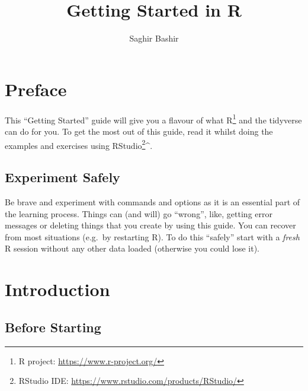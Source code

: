 \documentclass[a4paper,9pt,twocolumn,twoside,printwatermark=false]{pinp}
\title{Getting Started in R}
\author[]{Saghir Bashir}
\begin{document}
\verticaladjustment{-2pt}

\maketitle
\thispagestyle{firststyle}



\section{Preface}\label{preface}

This ``Getting Started'' guide will give you a flavour of what
R\footnote{R project: \url{https://www.r-project.org/}} and the
tidyverse can do for you. To get the most out of this guide, read it
whilst doing the examples and exercises using RStudio\footnote{RStudio
  IDE: \url{https://www.rstudio.com/products/RStudio/}}\^{}.

\subsection{Experiment Safely}\label{experiment-safely}

Be brave and experiment with commands and options as it is an essential
part of the learning process. Things can (and will) go ``wrong'', like,
getting error messages or deleting things that you create by using this
guide. You can recover from most situations (e.g.~by restarting R). To
do this ``safely'' start with a \emph{fresh} R session without any other
data loaded (otherwise you could lose it).

\section{Introduction}\label{introduction}

\subsection{Before Starting}\label{before-starting}
\end{document}
